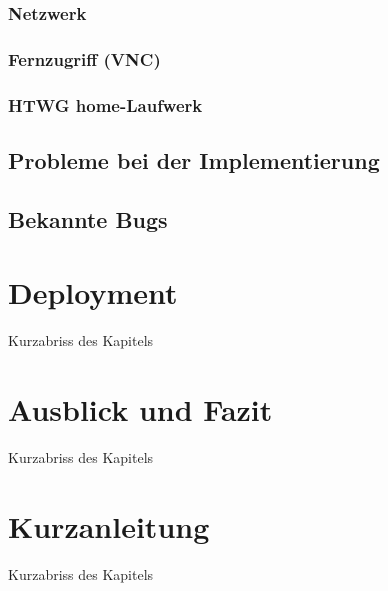 \subsection{Netzwerk}

\subsection{Fernzugriff (VNC)}

\subsection{HTWG home-Laufwerk}



\section{Probleme bei der Implementierung}

\section{Bekannte Bugs}


\chapter{Deployment}

Kurzabriss des Kapitels

\chapter{Ausblick und Fazit}

Kurzabriss des Kapitels

\chapter{Kurzanleitung}

Kurzabriss des Kapitels

		
   	\cleardoublepage
   	\setcounter{page}{12}
	 
	
\begin{appendix}   
\end{appendix}
\backmatter

